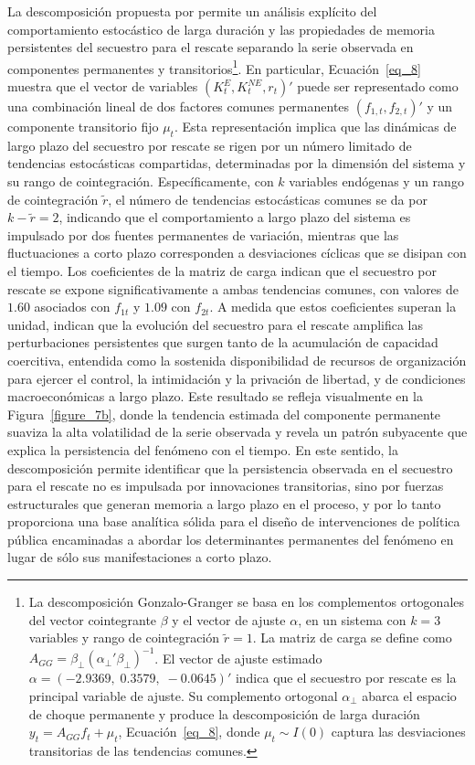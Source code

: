 \documentclass[12pt]{article}
\providecommand{\textcite}{\citet}
\theoremstyle{definition}
\theoremstyle{remark}
\newcommand{\1}{\mathbf{1}}
\begin{document}
La descomposición propuesta por \textcite{GonzaloGranger1995} permite un análisis explícito del comportamiento estocástico de larga duración y las propiedades de memoria persistentes del secuestro para el rescate separando la serie observada en componentes permanentes y transitorios\footnote{La descomposición Gonzalo-Granger se basa en los complementos ortogonales del vector cointegrante $\beta$ y el vector de ajuste $\alpha$, en un sistema con $k=3$ variables y rango de cointegración ${\tilde r}=1$. La matriz de carga se define como $A_{GG}=\beta_{\perp}(\alpha_{\perp}'\beta_{\perp})^{-1}$. El vector de ajuste estimado $\alpha=(-2.9369,\;0.3579,\;-0.0645)'$ indica que el secuestro por rescate es la principal variable de ajuste. Su complemento ortogonal $\alpha_{\perp}$ abarca el espacio de choque permanente y produce la descomposición de larga duración $y_t=A_{GG}f_t+\mu_t$, Ecuación~\ref{eq_8}, donde $\mu_t\sim I(0)$ captura las desviaciones transitorias de las tendencias comunes.}. En particular, Ecuación~\ref{eq_8} muestra que el vector de variables $(K^{E}_t, K^{NE}_t, r_t)'$ puede ser representado como una combinación lineal de dos factores comunes permanentes $(f_{1,t}, f_{2,t})'$ y un componente transitorio fijo $\mu_t$. Esta representación implica que las dinámicas de largo plazo del secuestro por rescate se rigen por un número limitado de tendencias estocásticas compartidas, determinadas por la dimensión del sistema y su rango de cointegración. Específicamente, con \(k\) variables endógenas y un rango de cointegración \(\tilde r\), el número de tendencias estocásticas comunes se da por \(k - \tilde r = 2\), indicando que el comportamiento a largo plazo del sistema es impulsado por dos fuentes permanentes de variación, mientras que las fluctuaciones a corto plazo corresponden a desviaciones cíclicas que se disipan con el tiempo. Los coeficientes de la matriz de carga indican que el secuestro por rescate se expone significativamente a ambas tendencias comunes, con valores de $1.60$ asociados con $f_{1t}$ y $1.09$ con $f_{2t}$. A medida que estos coeficientes superan la unidad, indican que la evolución del secuestro para el rescate amplifica las perturbaciones persistentes que surgen tanto de la acumulación de capacidad coercitiva, entendida como la sostenida disponibilidad de recursos de organización para ejercer el control, la intimidación y la privación de libertad, y de condiciones macroeconómicas a largo plazo. Este resultado se refleja visualmente en la Figura~\ref{figure_7b}, donde la tendencia estimada del componente permanente suaviza la alta volatilidad de la serie observada y revela un patrón subyacente que explica la persistencia del fenómeno con el tiempo. En este sentido, la descomposición permite identificar que la persistencia observada en el secuestro para el rescate no es impulsada por innovaciones transitorias, sino por fuerzas estructurales que generan memoria a largo plazo en el proceso, y por lo tanto proporciona una base analítica sólida para el diseño de intervenciones de política pública encaminadas a abordar los determinantes permanentes del fenómeno en lugar de sólo sus manifestaciones a corto plazo.
\end{document}
